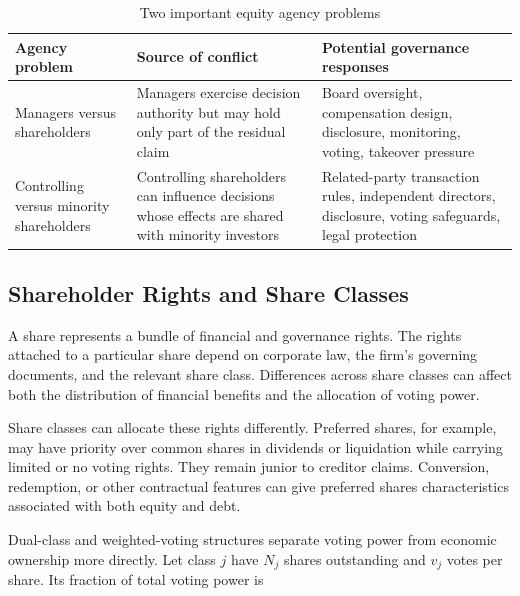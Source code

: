 \begin{table}[H]

\centering

\caption{Two important equity agency problems}

\label{tab:ch9-agency-problems}

\begin{tabularx}{\textwidth}{@{}p{3.0cm}Y Y@{}}

\toprule

\textbf{Agency problem} & \textbf{Source of conflict} & \textbf{Potential governance responses} \\

\midrule

Managers versus shareholders
& Managers exercise decision authority but may hold only part of the residual claim
& Board oversight, compensation design, disclosure, monitoring, voting, takeover pressure \\

Controlling versus minority shareholders
& Controlling shareholders can influence decisions whose effects are shared with minority investors
& Related-party transaction rules, independent directors, disclosure, voting safeguards, legal protection \\

\bottomrule

\end{tabularx}

\end{table}


\subsection{Shareholder Rights and Share Classes}

A share represents a bundle of financial and governance
rights. The rights attached to a particular share depend
on corporate law, the firm's governing documents, and
the relevant share class. Differences across share
classes can affect both the distribution of financial
benefits and the allocation of voting power.

Share classes can allocate these rights differently. Preferred shares, for example, may have priority over common shares in dividends or liquidation while carrying limited or no voting rights. They remain junior to creditor claims. Conversion, redemption, or other contractual features can give preferred shares characteristics associated with both equity and debt.

Dual-class and weighted-voting structures separate voting power from economic ownership more directly. Let class \(j\) have \(N_j\) shares outstanding and \(v_j\) votes per share. Its fraction of total voting power is

